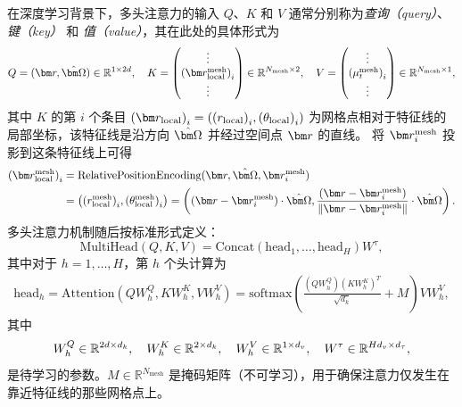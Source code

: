 在深度学习背景下，多头注意力的输入 $Q$、$K$ 和 $V$ 通常分别称为\emph{查询（query）}、\emph{键（key）} 和 \emph{值（value）}，其在此处的具体形式为
\begin{equation}
    Q = (\br, \bOmega)\in \mathbb{R}^{1\times 2d}, \quad
    K =
    \begin{pmatrix}
        \vdots                               \\
        {(\br^\text{mesh}_{\text{local}})}_i \\
        \vdots
    \end{pmatrix}\in\mathbb{R}^{N_\text{mesh} \times 2},
    \quad
    V =
    \begin{pmatrix}
        \vdots                    \\
        {(\mu_t^{\text{mesh}})}_i \\
        \vdots
    \end{pmatrix}\in\mathbb{R}^{N_\text{mesh}\times 1},
\end{equation}
其中 $K$ 的第 $i$ 个条目 ${(\br_{\text{local}})}_i=\left({(r_\text{local})}_i, {(\theta_\text{local})}_i\right)$ 为网格点相对于特征线的局部坐标，该特征线是沿方向 $\bOmega$ 并经过空间点 $\br$ 的直线。
将 $\br^\text{mesh}_i$ 投影到这条特征线上可得
\begin{equation}
    \begin{aligned}
        {(\br^\text{mesh}_{\text{local}})}_i
         & =\text{RelativePositionEncoding}(\br,\bOmega,\br^\text{mesh}_i)                        \\
         & = \left({(r^\text{mesh}_\text{local})}_i, {(\theta^\text{mesh}_\text{local})}_i\right)
        = \left((\br-\br^{\text{mesh}}_i)\cdot\bOmega, \frac{(\br-\br^{\text{mesh}}_i)}{
            \| \br-\br^{\text{mesh}}_i\|}\cdot \bOmega\right).
    \end{aligned}
\end{equation}
多头注意力机制随后按标准形式定义：
\begin{equation}
    \text{MultiHead}(Q, K, V) = \text{Concat}(\text{head}_1,\ldots,\text{head}_H)W^\tau,
\end{equation}
其中对于 $h=1,\ldots,H$，第 $h$ 个头计算为
\begin{equation}
    \begin{aligned}
        \text{head}_h = \text{Attention}(QW_h^Q, KW_h^K, VW_h^V)
        = \text{softmax}\left(\frac{(QW_h^Q){(KW_h^K)}^T}{\sqrt{d_k}} + M\right)VW_h^V,
    \end{aligned}
\end{equation}
其中
\begin{equation}
    W_h^Q\in \mathbb{R}^{2d\times d_k}, \quad W_h^K\in \mathbb{R}^{2\times d_k}, \quad W_h^V\in \mathbb{R}^{1\times d_v}, \quad W^\tau\in\mathbb{R}^{Hd_v \times d_{\tau}},
\end{equation}
是待学习的参数。$M\in\mathbb{R}^{N_\text{mesh}}$ 是掩码矩阵（不可学习），用于确保注意力仅发生在靠近特征线的那些网格点上。

